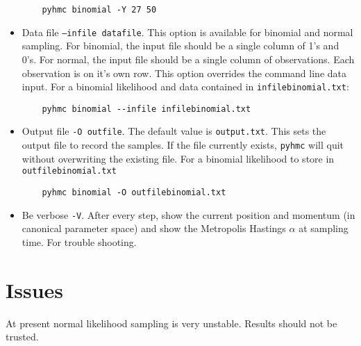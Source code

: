 \documentclass[10pt,letterpaper]{article}
\begin{document}
\begin{itemize}
\begin{verbatim}
	pyhmc binomial -Y 27 50
\end{verbatim}

	\item Data file \texttt{--infile datafile}.  This option is available for
		binomial and normal sampling.  For binomial, the input file should be a
		single column of 1's and 0's.  For normal, the input file should be a
		single column of observations.  Each observation is on it's own row.
		This option overrides the command line data input.  For a binomial
		likelihood and data contained in \texttt{infilebinomial.txt}:

\begin{verbatim}
	pyhmc binomial --infile infilebinomial.txt
\end{verbatim}

	\item Output file \texttt{-O outfile}.  The default value is
		\texttt{output.txt}.  This sets the output file to record the samples.
		If the file currently exists, \texttt{pyhmc} will quit without
		overwriting the existing file.  For a binomial likelihood to store in
		\texttt{outfilebinomial.txt}

\begin{verbatim}
	pyhmc binomial -O outfilebinomial.txt
\end{verbatim}

	\item Be verbose \texttt{-V}.  After every step, show the current position
		and momentum (in canonical parameter space) and show the Metropolis
		Hastings $\alpha$ at sampling time.  For trouble shooting.
\end{itemize}

\section{Issues}
\label{sec:issues}

At present normal likelihood sampling is very unstable.  Results should not be
trusted.



\end{document}
